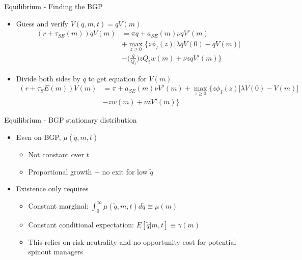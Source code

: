 \documentclass[english,usenames,dvipsnames]{beamer}
\begin{document}
\begin{frame}[label = incumbent_BGP]{Equilibrium - Finding the BGP}\hyperlink{confirming_bgp}{}
\begin{itemize}
	\item Guess and verify $V(q,m,t) = qV(m)$
	\footnotesize
	\begin{align*}
	(r + \tau_{SE}(m)) q V(m) &= \pi q + a_{SE}(m) \nu q V'(m) \\
	& + \max_{z \ge 0} \Big \{ z \phi_I(z) \big[\lambda q V(0) - q V(m) \big] \\
	& - \big(\frac{q}{Q_t}\big)z Q_t w(m) + \nu z q V'(m) \Big\}
	\end{align*}
	\normalsize
	\item Divide both sides by $q$ to get equation for $V(m)$
	\footnotesize
	\begin{align*}
	(r + \tau_SE(m)) V(m) &= \pi + a_{SE}(m) \nu V'(m) + \max_{z \ge 0} \Big \{ z \phi_I(z) \big[\lambda V(0) - V(m) \big] \\
	& - z w(m) + \nu z V'(m) \Big\}
	\end{align*}
\end{itemize}
\end{frame}

\begin{frame}[label = BGP_stationary_distribution]{Equilibrium - BGP stationary distribution}\hyperlink{equilibrium_BGP}{}
\begin{itemize}
	\item Even on BGP, $\mu(\tilde{q},m,t)$ 
	\begin{itemize}
		\item \alert{Not constant over $t$}  
		\item Proportional growth + no exit for low $\tilde{q}$
	\end{itemize} 
	\item Existence only requires
	\begin{itemize}
		\item Constant marginal: $\int_0^{\infty} \mu(\tilde{q},m,t) d\tilde{q} \equiv \mu(m)$
		\item Constant conditional expectation: $E[\tilde{q} | m,t] \equiv \gamma(m)$ 
		\item This relies on risk-neutrality and no opportunity cost for potential spinout managers
	\end{itemize} 
\end{itemize}
\end{frame}
\end{document}
